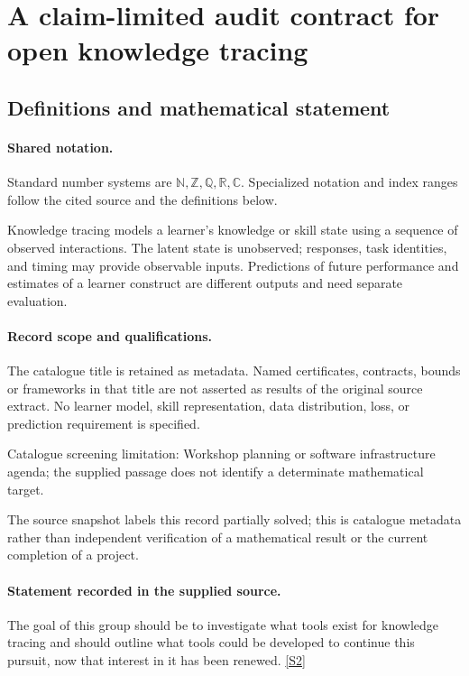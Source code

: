 \documentclass[11pt]{article}
\newcommand{\sref}[2]{\hyperlink{source:#1:#2}{[S#2]}}
\begin{document}
\section{A claim-limited audit contract for open knowledge tracing}\label{statement}

\subsection{Definitions and mathematical statement}

\paragraph{Shared notation.}Standard number systems are $\mathbb N,\mathbb Z,\mathbb Q,\mathbb R,\mathbb C$. Specialized notation and index ranges follow the cited source and the definitions below.


Knowledge tracing models a learner's knowledge or skill state using a sequence of observed interactions. The latent state is unobserved; responses, task identities, and timing may provide observable inputs. Predictions of future performance and estimates of a learner construct are different outputs and need separate evaluation.
\paragraph{Record scope and qualifications.}
The catalogue title is retained as metadata. Named certificates, contracts, bounds or frameworks in that title are not asserted as results of the original source extract.
No learner model, skill representation, data distribution, loss, or prediction requirement is specified.

Catalogue screening limitation: Workshop planning or software infrastructure agenda; the supplied passage does not identify a determinate mathematical target.

The source snapshot labels this record partially solved; this is catalogue metadata rather than independent verification of a mathematical result or the current completion of a project.
\paragraph{Statement recorded in the supplied source.}
The goal of this group should be to investigate what tools exist for knowledge tracing and should outline what tools could be developed to continue this pursuit, now that interest in it has been renewed. \sref{statement}{2}
\end{document}
